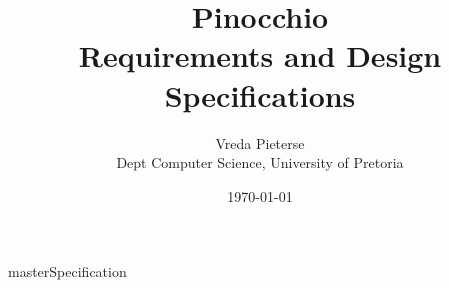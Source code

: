 \documentclass[titlepage]{article}
\title{{\Huge Pinocchio} \\ Requirements and Design Specifications}
\author{Vreda Pieterse\\ Dept Computer Science, University of Pretoria}
\date{\today}
\begin{document}
\maketitle

\tableofcontents

\newpage

{masterSpecification}
\end{document}
